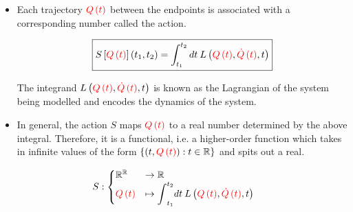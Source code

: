 \documentclass{beamer}
\begin{document}
\begin{frame}
\begin{itemize}
\item Each trajectory $\textcolor{red}{Q \left( t \right)}$ between the endpoints is associated with a corresponding number called the action.

$$\boxed{S \left[ \textcolor{red}{Q \left( t \right)} \right] \left( t_1, t_2 \right) = \int_{t_1}^{t_2} dt \: L \left( \textcolor{red}{Q \left( t \right)}, \textcolor{red}{\dot{Q} \left( t \right)}, t \right)}$$

The integrand $L \left( \textcolor{red}{Q \left( t \right)}, \textcolor{red}{\dot{Q} \left( t \right)}, t \right)$ is known as the Lagrangian of the system being modelled and encodes the dynamics of the system.

\item In general, the action $S$ maps $\textcolor{red}{Q \left( t \right)}$ to a real number determined by the above integral. Therefore, it is a functional, i.e. a higher-order function which takes in infinite values of the form $\left\{ \left( t, \textcolor{red}{Q \left( t \right)} \right) : t \in \mathbb{R} \right\}$ and spits out a real.
\end{itemize}

$$
S : \begin{cases} \mathbb{R}^\mathbb{R} & \to \mathbb{R} \\ \textcolor{red}{Q \left( t \right)} & \mapsto \displaystyle{\int}_{t_1}^{t_2} dt \: L \left( \textcolor{red}{Q \left( t \right)}, \textcolor{red}{\dot{Q} \left( t \right)}, t \right) \end{cases}
$$
\end{frame}
\end{document}
